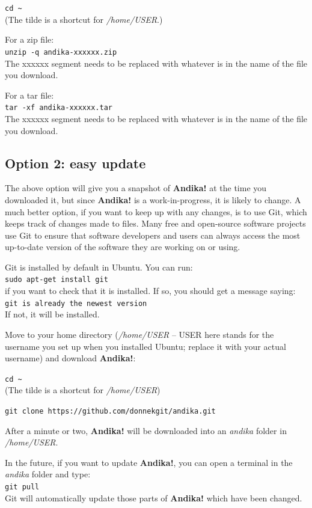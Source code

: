 \verb|cd ~|\\
(The tilde is a shortcut for \textit{/home/USER}.)

For a zip file:\\
\verb|unzip -q andika-xxxxxx.zip|\\
The xxxxxx segment needs to be replaced with whatever is in the name of the file you download.

For a tar file:\\
\verb|tar -xf andika-xxxxxx.tar|\\
The xxxxxx segment needs to be replaced with whatever is in the name of the file you download.

\subsection{Option 2: easy update}
\label{s:gitclone}

The above option will give you a snapshot of \textbf{Andika!} at the time you downloaded it, but since \textbf{Andika!} is a work-in-progress, it is likely to change.  A much better option, if you want to keep up with any changes, is to use Git, which keeps track of changes made to files.  Many free and open-source software projects use Git to ensure that software developers and users can always access the most up-to-date version of the software they are working on or using.

Git is installed by default in Ubuntu.  You can run:\\
\verb|sudo apt-get install git|\\
if you want to check that it is installed.  If so, you should get a message saying:\\
\verb|git is already the newest version|\\
If not, it will be installed.

Move to your home directory (\textit{/home/USER} -- USER here stands for the username you set up when you installed Ubuntu; replace it with your actual username) and download \textbf{Andika!}:

\verb|cd ~|\\
(The tilde is a shortcut for \textit{/home/USER})

\verb|git clone https://github.com/donnekgit/andika.git|

After a minute or two, \textbf{Andika!} will be downloaded into an \textit{andika} folder in \textit{/home/USER}.

In the future, if you want to update \textbf{Andika!}, you can open a terminal in the \textit{andika} folder and type:\\
\verb|git pull|\\
Git will automatically update those parts of \textbf{Andika!} which have been changed.

